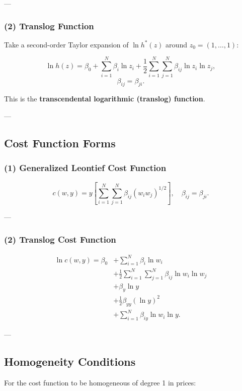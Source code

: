 ---

\subsubsection*{(2) Translog Function}

Take a second-order Taylor expansion of $\ln h^*(z)$ around
$z_0 = (1,\dots,1)$:

\[
\ln h(z)
=
\beta_0
+
\sum_{i=1}^N \beta_i \ln z_i
+
\frac{1}{2}
\sum_{i=1}^N \sum_{j=1}^N
\beta_{ij} \ln z_i \ln z_j,
\]
\[
\beta_{ij} = \beta_{ji}.
\]

This is the \textbf{transcendental logarithmic (translog) function}.

---

\subsection*{Cost Function Forms}

\subsubsection*{(1) Generalized Leontief Cost Function}

\[
c(w,y)
=
y \left[
\sum_{i=1}^N \sum_{j=1}^N
\beta_{ij} (w_i w_j)^{1/2}
\right],
\quad \beta_{ij} = \beta_{ji}.
\]

---

\subsubsection*{(2) Translog Cost Function}

\[
\begin{aligned}
\ln c(w,y)
=
\beta_0
&+
\sum_{i=1}^N \beta_i \ln w_i\\
&+
\frac{1}{2}
\sum_{i=1}^N \sum_{j=1}^N
\beta_{ij} \ln w_i \ln w_j\\
&+
\beta_y \ln y\\
&+
\frac{1}{2} \beta_{yy} (\ln y)^2\\
&+
\sum_{i=1}^N \beta_{iy} \ln w_i \ln y.
\end{aligned}
\]

---

\subsection*{Homogeneity Conditions}

For the cost function to be homogeneous of degree 1 in prices:

